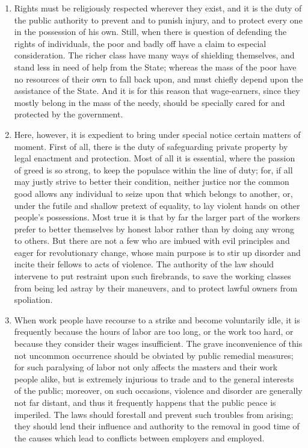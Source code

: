 \documentclass{book}
\begin{document}
\begin{enumerate}
	\item Rights must be religiously respected wherever they exist, and it is the duty of the public authority to prevent and to punish injury, and to protect every one in the possession of his own. Still, when there is question of defending the rights of individuals, the poor and badly off have a claim to especial consideration. The richer class have many ways of shielding themselves, and stand less in need of help from the State; whereas the mass of the poor have no resources of their own to fall back upon, and must chiefly depend upon the assistance of the State. And it is for this reason that wage-earners, since they mostly belong in the mass of the needy, should be specially cared for and protected by the government.


	\item Here, however, it is expedient to bring under special notice certain matters of moment. First of all, there is the duty of safeguarding private property by legal enactment and protection. Most of all it is essential, where the passion of greed is so strong, to keep the populace within the line of duty; for, if all may justly strive to better their condition, neither justice nor the common good allows any individual to seize upon that which belongs to another, or, under the futile and shallow pretext of equality, to lay violent hands on other people’s possessions. Most true it is that by far the larger part of the workers prefer to better themselves by honest labor rather than by doing any wrong to others. But there are not a few who are imbued with evil principles and eager for revolutionary change, whose main purpose is to stir up disorder and incite their fellows to acts of violence. The authority of the law should intervene to put restraint upon such firebrands, to save the working classes from being led astray by their maneuvers, and to protect lawful owners from spoliation.


	\item When work people have recourse to a strike and become voluntarily idle, it is frequently because the hours of labor are too long, or the work too hard, or because they consider their wages insufficient. The grave inconvenience of this not uncommon occurrence should be obviated by public remedial measures; for such paralysing of labor not only affects the masters and their work people alike, but is extremely injurious to trade and to the general interests of the public; moreover, on such occasions, violence and disorder are generally not far distant, and thus it frequently happens that the public peace is imperiled. The laws should forestall and prevent such troubles from arising; they should lend their influence and authority to the removal in good time of the causes which lead to conflicts between employers and employed.



\end{enumerate}
\end{document}
